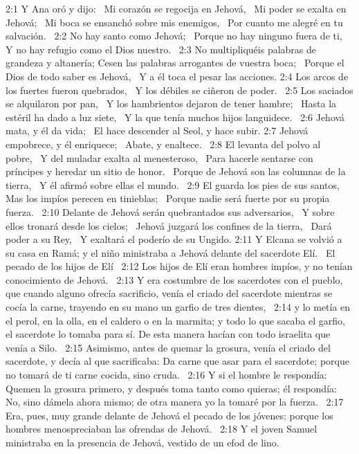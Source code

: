 2:1 Y Ana oró y dijo:  
Mi corazón se regocija en Jehová,  
Mi poder se exalta en Jehová;  
Mi boca se ensanchó sobre mis enemigos,  
Por cuanto me alegré en tu salvación.  
2:2 No hay santo como Jehová;  
Porque no hay ninguno fuera de ti,  
Y no hay refugio como el Dios nuestro.  
2:3 No multipliquéis palabras de grandeza y altanería; 
Cesen las palabras arrogantes de vuestra boca;  
Porque el Dios de todo saber es Jehová,  
Y a él toca el pesar las acciones. 
2:4 Los arcos de los fuertes fueron quebrados,  
Y los débiles se ciñeron de poder.  
2:5 Los saciados se alquilaron por pan,  
Y los hambrientos dejaron de tener hambre;  
Hasta la estéril ha dado a luz siete,  
Y la que tenía muchos hijos languidece.  
2:6 Jehová mata, y él da vida;  
El hace descender al Seol, y hace subir. 
2:7 Jehová empobrece, y él enriquece;  
Abate, y enaltece.  
2:8 El levanta del polvo al pobre,  
Y del muladar exalta al menesteroso,  
Para hacerle sentarse con príncipes y heredar un sitio de honor.  
Porque de Jehová son las columnas de la tierra,  
Y él afirmó sobre ellas el mundo.  
2:9 El guarda los pies de sus santos,  
Mas los impíos perecen en tinieblas;  
Porque nadie será fuerte por su propia fuerza.  
2:10 Delante de Jehová serán quebrantados sus adversarios,  
Y sobre ellos tronará desde los cielos;  
Jehová juzgará los confines de la tierra,  
Dará poder a su Rey,  
Y exaltará el poderío de su Ungido. 
2:11 Y Elcana se volvió a su casa en Ramá; y el niño ministraba a Jehová delante del sacerdote Elí.  
El pecado de los hijos de Elí  
2:12 Los hijos de Elí eran hombres impíos, y no tenían conocimiento de Jehová.  
2:13 Y era costumbre de los sacerdotes con el pueblo, que cuando alguno ofrecía sacrificio, venía el criado del sacerdote mientras se cocía la carne, trayendo en su mano un garfio de tres dientes,  
2:14 y lo metía en el perol, en la olla, en el caldero o en la marmita; y todo lo que sacaba el garfio, el sacerdote lo tomaba para sí. De esta manera hacían con todo israelita que venía a Silo.  
2:15 Asimismo, antes de quemar la grosura, venía el criado del sacerdote, y decía al que sacrificaba: Da carne que asar para el sacerdote; porque no tomará de ti carne cocida, sino cruda.  
2:16 Y si el hombre le respondía: Quemen la grosura primero, y después toma tanto como quieras; él respondía: No, sino dámela ahora mismo; de otra manera yo la tomaré por la fuerza.  
2:17 Era, pues, muy grande delante de Jehová el pecado de los jóvenes; porque los hombres menospreciaban las ofrendas de Jehová.  
2:18 Y el joven Samuel ministraba en la presencia de Jehová, vestido de un efod de lino.  
